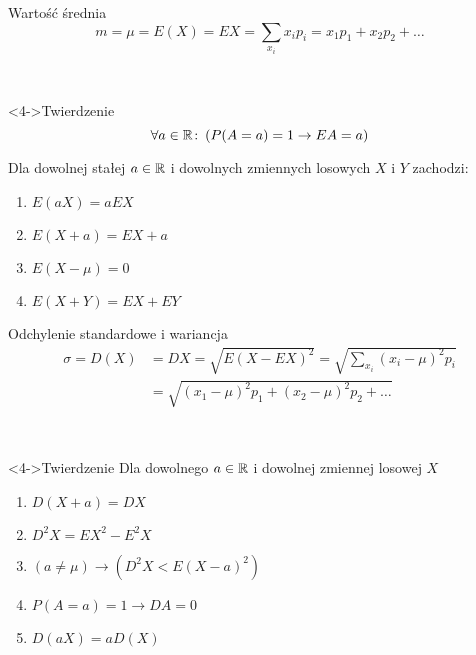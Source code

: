 \documentclass{mp}
\subtitle{Momenty zmiennych losowych}
\begin{document}
\frame{\titlepage}

\begin{frame}{Wartość średnia}
\[ m=\mu=E(X)=EX=\sum_{x_i} x_ip_i=x_1p_1+x_2p_2+\ldots \]
{
	\begin{center}
	     \\
	\only<3->{\dice{1} \dice{2} \dice{3} \dice{6} \dice{6} \dice{6}}
	\end{center}
}
\begin{block}<4->{Twierdzenie}
{
	\[\forall a\in\mathbb{R}\colon \left( P(A=a)=1 \to EA=a \right) \]
}
{
Dla dowolnej stałej $a\in\mathbb{R}$ i dowolnych zmiennych losowych $X$ i $Y$ zachodzi:
\begin{enumerate}
\item<5-> $E(aX)=aEX$
\item<6-> $E(X+a)=EX+a$
\item<7-> $E(X-\mu)=0$
\item<8-> $E(X+Y)=EX+EY$ %
\end{enumerate}
}
\end{block}
\end{frame}
\begin{frame}{Odchylenie standardowe i wariancja}
\begin{align*}
 \sigma=D(X)&=DX=\sqrt{E(X-EX)^2} =\sqrt{\sum_{x_i}(x_i-\mu)^2p_i} \\ & =
 \sqrt{(x_1-\mu)^2p_1+(x_2-\mu)^2p_2+\ldots}
\end{align*}
{
	\begin{center}
	     \\
	\only<3->{\dice{1} \dice{2} \dice{3} \dice{6} \dice{6} \dice{6}}
	\end{center}
}
\begin{block}<4->{Twierdzenie}
	Dla dowolnego $a\in\mathbb{R}$ i dowolnej zmiennej losowej $X$
\begin{enumerate}
\item<4-> $D(X+a)=DX $
\item<5-> $D^2X=EX^2-E^2X $
\item<6-> $(a\neq \mu)\to (D^2X<E(X-a)^2) $
\item<7-> $P(A=a)=1 \to DA=0 $
\item<8-> $D(aX)=aD(X) $
\end{enumerate}
\end{block}
\end{frame}
\end{document}
